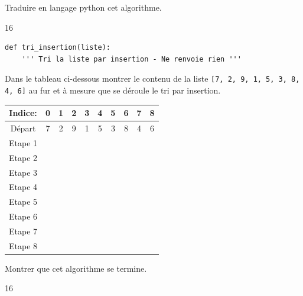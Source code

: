 \documentclass[a4paper,10pt]{report}
\def\documentpath{./Sources_Latex}
\begin{document}
\begin{enumerate}
    \item Traduire en langage python cet algorithme.
    

    \begin{answer}{1}{6}
        \begin{verbatim}
def tri_insertion(liste):
    ''' Tri la liste par insertion - Ne renvoie rien '''

        \end{verbatim}
    \end{answer}


    \begin{minipage}{0.48\linewidth}
        \item Dans le tableau ci-dessous montrer le contenu de la liste \verb|[7, 2, 9, 1, 5, 3, 8, 4, 6]| au fur et à mesure que se déroule le tri par insertion.
    
    \begin{tabular}{|c|c|c|c|c|c|c|c|c|c|}
        \hline
        Indice: & 0 & 1 & 2 & 3 & 4 & 5 & 6 & 7 & 8 \\ \hline
        Départ&7&2&9&1&5&3&8&4&6 \\ \hline
        Etape 1&&&&&&&&& \\ \hline
        Etape 2&&&&&&&&& \\ \hline
        Etape 3&&&&&&&&& \\ \hline
        Etape 4&&&&&&&&& \\ \hline
        Etape 5&&&&&&&&& \\ \hline
        Etape 6&&&&&&&&& \\ \hline
        Etape 7&&&&&&&&& \\ \hline
        Etape 8&&&&&&&&& \\ \hline
    \end{tabular}
    \end{minipage}\hfill
    \begin{minipage}{0.48\linewidth}
        \item Montrer que cet algorithme se termine.
    \begin{answer}{1}{6}
        
    \end{answer}
    \end{minipage}
    
\end{enumerate}

\end{document}

